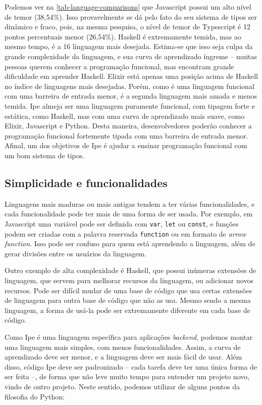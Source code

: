 Podemos ver na \autoref{tab-language-comparisons} que Javascript possui um alto nível de temor (38,54\%). Isso
provavelmente se dá pelo fato do seu sistema de tipos ser dinâmico e fraco, pois,
na mesma pesquisa, o nível de temor de Typescript é 12 pontos percentuais menor
(26,54\%). Haskell é extremamente temida, mas ao mesmo tempo, é a 16\textordfeminine{}
linguagem mais desejada. Estima-se que isso seja culpa da grande complexidade da
linguagem, e sua curva de aprendizado íngreme -- muitas pessoas querem conhecer
a programação funcional, mas encontram grande dificuldade em aprender Haskell.
Elixir está apenas uma posição acima de Haskell no índice de linguagens mais
desejadas. Porém, como é uma linguagem funcional com uma barreira de entrada menor,
é a segunda linguagem mais amada e menos temida. Ipe almeja ser uma linguagem
puramente funcional, com tipagem forte e estática, como Haskell, mas com uma
curva de aprendizado mais suave, como Elixir, Javascript e Python. Desta maneira,
desenvolvedores poderão conhecer a programação funcional fortemente tipada com
uma barreira de entrada menor. Afinal, um dos objetivos de Ipe é ajudar a
ensinar programação funcional com um bom sistema de tipos.


\subsection{Simplicidade e funcionalidades}

Linguagens mais maduras ou mais antigas tendem a ter várias funcionalidades, e
cada funcionalidade pode ter mais de uma forma de ser usada. Por exemplo, em
Javascript uma variável pode ser definida com \texttt{var}, \texttt{let} ou
\texttt{const}, e funções podem ser criadas com a palavra reservada \texttt{function}
ou em formato de \textit{arrow function}. Isso pode ser confuso para quem está
aprendendo a linguagem, além de gerar divisões entre os usuários da linguagem.

Outro exemplo de alta complexidade é Haskell, que possui inúmeras extensões de
linguagem, que servem para melhorar recursos da linguagem, ou adicionar novos
recursos. Pode ser difícil mudar de uma base de código que usa certas extensões
de linguagem para outra base de código que não as usa. Mesmo sendo a mesma linguagem,
a forma de usá-la pode ser extremamente diferente em cada base de código.

Como Ipe é uma linguagem específica para aplicações \textit{backend}, podemos
montar uma linguagem mais simples, com menos funcionalidades. Assim, a curva de
aprendizado deve ser menor, e a linguagem deve ser mais fácil de usar. Além disso,
código Ipe deve ser padronizado -- cada tarefa deve ter uma única forma de ser feita --,
de forma que não leve muito tempo para entender um projeto novo, vindo de outro projeto.
Neste sentido, podemos utilizar de alguns pontos da filosofia do Python:

